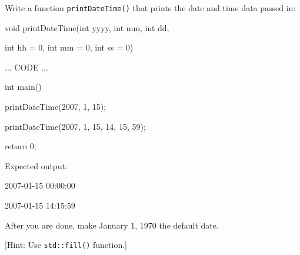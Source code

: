 Write a function \texttt{printDateTime()} that prints the date and time data passed in:



\begin{consolethree}[escapeinside=||]

void printDateTime(int yyyy, int mm, int dd,

                   int hh = 0, int mm = 0, int ss = 0)

{

    ... CODE ...

}



int main()

{

    printDateTime(2007, 1, 15);

    printDateTime(2007, 1, 15, 14, 15, 59);

    return 0;

}

\end{consolethree}



Expected output:



\begin{console}

2007-01-15 00:00:00

2007-01-15 14:15:59

\end{console}



After you are done, make January 1, 1970 the default date.



[Hint: Use \texttt{std::fill()} function.]

